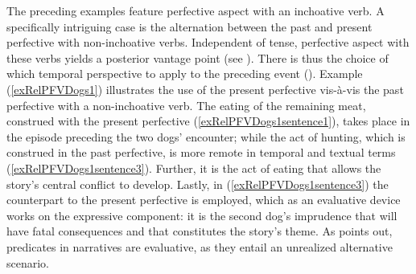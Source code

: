 The preceding examples feature perfective aspect with an inchoative verb. A specifically intriguing case is the alternation between the past and present perfective with non-inchoative verbs. Independent of tense, perfective aspect with these verbs yields a posterior vantage point (see ). There is thus the choice of which temporal perspective to apply to the preceding event (). Example (\ref{exRelPFVDogs1}) illustrates the use of the present perfective vis-à-vis the past perfective with a non-inchoative verb. The eating of the remaining meat, construed with the present perfective (\ref{exRelPFVDogs1sentence1}), takes place in the episode preceding the two dogs' encounter; while the act of hunting, which is construed in the past perfective, is more remote in temporal and textual terms (\ref{exRelPFVDogs1sentence3}). Further, it is the act of eating that allows the story's central conflict to develop. Lastly, in (\ref{exRelPFVDogs1sentence3}) the  counterpart to the present perfective is employed, which as an evaluative device works on the expressive component:  it is the second dog's imprudence that will have fatal consequences and that constitutes the story's theme. As \citet[159]{FleischmanS1990} points out,  predicates in narratives are evaluative, as they entail an unrealized alternative scenario. 

